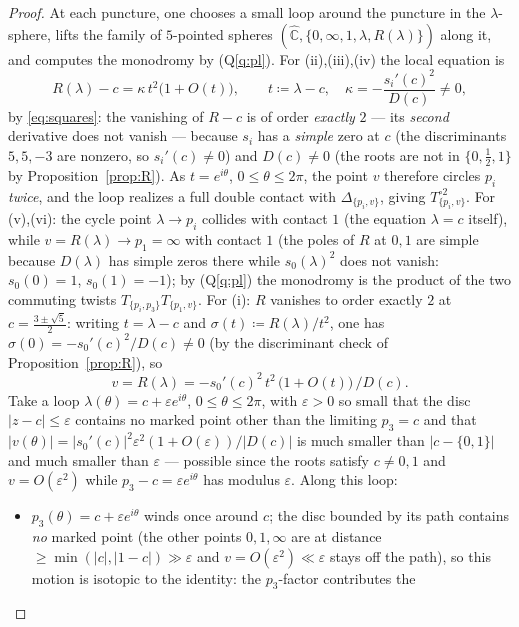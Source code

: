 \documentclass[11pt]{article}
\theoremstyle{definition}
\theoremstyle{remark}
\newcommand{\Chat}{\widehat{\mathbb C}}
\begin{document}
\begin{proof}
At each puncture, one chooses a small loop around the puncture in the
$\lambda$-sphere, lifts the family of $5$-pointed spheres
$(\Chat,\{0,\infty,1,\lambda,R(\lambda)\})$ along it, and computes the
monodromy by (Q\ref{q:pl}).  For (ii),(iii),(iv) the local equation is
\[
R(\lambda)-c=\kappa\,t^2\bigl(1+O(t)\bigr),\qquad t\coloneqq\lambda-c,\quad
\kappa=-\frac{s_i'(c)^2}{D(c)}\neq0,
\]
by \eqref{eq:squares}: the vanishing of $R-c$ is of order \emph{exactly}
$2$ — its \emph{second} derivative does not vanish — because $s_i$ has a
\emph{simple} zero at $c$ (the discriminants $5,5,-3$ are nonzero, so
$s_i'(c)\neq0$) and $D(c)\neq0$ (the roots are not in
$\{0,\tfrac12,1\}$ by Proposition~\ref{prop:R}).  As $t=e^{i\theta}$,
$0\le\theta\le2\pi$, the point $v$ therefore circles $p_i$ \emph{twice},
and the loop realizes a full double contact with
$\Delta_{\{p_i,v\}}$, giving $T_{\{p_i,v\}}^{\circ2}$.
For (v),(vi): the cycle point $\lambda\to p_{i}$ collides with contact
$1$ (the equation $\lambda=c$ itself), while $v=R(\lambda)\to
p_1=\infty$ with contact $1$ \textup{(}the poles of $R$ at $0,1$ are
simple because $D(\lambda)$ has simple zeros there while
$s_0(\lambda)^2$ does not vanish: $s_0(0)=1$, $s_0(1)=-1$\textup{)};
by (Q\ref{q:pl}) the monodromy is the product of the two commuting
twists $T_{\{p_i,p_3\}}T_{\{p_1,v\}}$.
For (i): $R$ vanishes to order exactly $2$ at
$c=\tfrac{3\pm\sqrt5}2$: writing $t=\lambda-c$ and
$\sigma(t)\coloneqq R(\lambda)/t^2$, one has
$\sigma(0)=-s_0'(c)^2/D(c)\neq0$ (by the discriminant check of
Proposition~\ref{prop:R}), so
\[
v=R(\lambda)=-s_0'(c)^2\,t^2\,\bigl(1+O(t)\bigr)\,\big/D(c) .
\]
Take a loop $\lambda(\theta)=c+\varepsilon e^{i\theta}$,
$0\le\theta\le2\pi$, with $\varepsilon>0$ so small that the disc
$|z-c|\le\varepsilon$ contains no marked point other than the limiting
$p_3=c$ and that $|v(\theta)|=|s_0'(c)|^2\varepsilon^2(1+O(\varepsilon))/|D(c)|$
is much smaller than $|c-\{0,1\}|$ and much smaller than
$\varepsilon$ — possible since the roots satisfy $c\neq0,1$ and
$v=O(\varepsilon^2)$ while $p_3-c=\varepsilon e^{i\theta}$ has modulus
$\varepsilon$.  Along this loop:
\begin{itemize}
\item $p_3(\theta)=c+\varepsilon e^{i\theta}$ winds once around $c$;
the disc bounded by its path contains \emph{no} marked point (the other
points $0,1,\infty$ are at distance $\ge\min(|c|,|1-c|)\gg\varepsilon$
and $v=O(\varepsilon^2)\ll\varepsilon$ stays off the path), so this
motion is isotopic to the identity: the $p_3$-factor contributes the

\end{itemize}
\end{proof}
\end{document}
